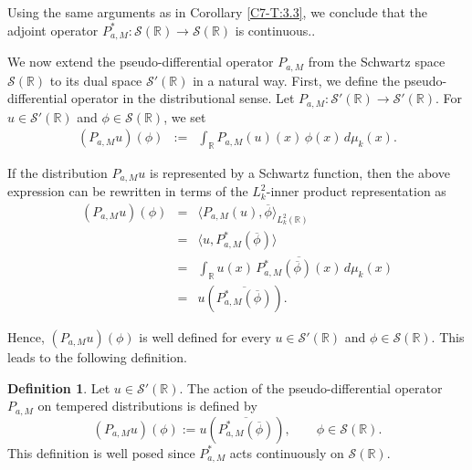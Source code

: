 \documentclass[12pt,a4paper,reqno]{amsproc}
\theoremstyle{definition}
\newtheorem{definition}[theorem]{Definition}
\theoremstyle{remark}
\numberwithin{equation}{section}
\begin{document}
Using the same arguments as in Corollary \ref{C7-T:3.3}, we conclude that the adjoint operator $P^*_{a,M}: \mathcal{S}(\mathbb{R}) \to \mathcal{S}(\mathbb{R})$ is continuous.. 
\par We now extend the pseudo-differential operator $P_{a,M}$ from the Schwartz space $\mathcal{S}(\mathbb{R})$ to its dual space $\mathcal{S}'(\mathbb{R})$ in a natural way. First, we define the pseudo-differential operator in the distributional sense. Let 
$P_{a,M}:\mathcal{S}'(\mathbb{R}) \to \mathcal{S}'(\mathbb{R})$. 
For $u \in \mathcal{S}'(\mathbb{R})$ and $\phi \in \mathcal{S}(\mathbb{R})$, we set
\begin{eqnarray*}
(P_{a,M}u)(\phi)
&:=&
\int_{\mathbb{R}} P_{a,M}(u)(x)\,\phi(x)\,d\mu_k(x).
\end{eqnarray*}

If the distribution $P_{a,M}u$ is represented by a Schwartz function, then the above expression can be rewritten in terms of the $L_k^2$-inner product representation as
\begin{eqnarray*}
(P_{a,M}u)(\phi)
&=&
\langle P_{a,M}(u), \overline{\phi} \rangle_{L_k^2(\mathbb{R})} \\
&=&
\langle u, P_{a,M}^*(\overline{\phi}) \rangle \\
&=&
\int_{\mathbb{R}} u(x)\,
\overline{P_{a,M}^*(\overline{\phi})(x)}\,d\mu_k(x) \\
&=&
u\!\left(\overline{P_{a,M}^*(\overline{\phi})}\right).
\end{eqnarray*}

Hence, $(P_{a,M}u)(\phi)$ is well defined for every 
$u \in \mathcal{S}'(\mathbb{R})$ and $\phi \in \mathcal{S}(\mathbb{R})$. 
This leads to the following definition.

\begin{definition}\label{C7-D3.7}
Let $u \in \mathcal{S}'(\mathbb{R})$. The action of the pseudo-differential operator 
$P_{a,M}$ on tempered distributions is defined by
\begin{equation*}
(P_{a,M}u)(\phi)
:=
u\!\left(\overline{P_{a,M}^*(\overline{\phi})}\right),
\qquad 
\phi \in \mathcal{S}(\mathbb{R}).
\end{equation*}
This definition is well posed since $P_{a,M}^*$ acts continuously on 
$\mathcal{S}(\mathbb{R})$.
\end{definition}

\end{document}
